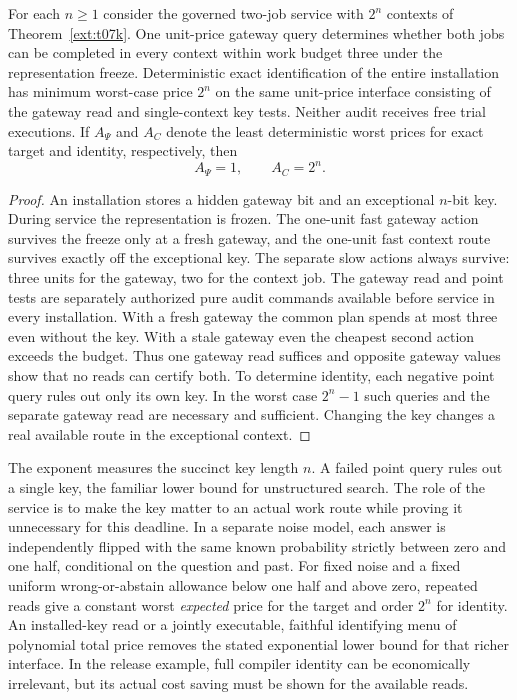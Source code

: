 \begin{theorem}\label{body:key}
For each \(n\ge1\) consider the governed two-job service with \(2^n\) contexts of Theorem~\ref{ext:t07k}. One unit-price gateway query determines whether both jobs can be completed in every context within work budget three under the representation freeze. Deterministic exact identification of the entire installation has minimum worst-case price \(2^n\) on the same unit-price interface consisting of the gateway read and single-context key tests. Neither audit receives free trial executions. If \(A_\Psi\) and \(A_C\) denote the least deterministic worst prices for exact target and identity, respectively, then
\[
 A_\Psi=1,\qquad A_C=2^n .
\]
\end{theorem}
\begin{proof}
An installation stores a hidden gateway bit and an exceptional \(n\)-bit key. During service the representation is frozen. The one-unit fast gateway action survives the freeze only at a fresh gateway, and the one-unit fast context route survives exactly off the exceptional key. The separate slow actions always survive: three units for the gateway, two for the context job. The gateway read and point tests are separately authorized pure audit commands available before service in every installation. With a fresh gateway the common plan spends at most three even without the key. With a stale gateway even the cheapest second action exceeds the budget. Thus one gateway read suffices and opposite gateway values show that no reads can certify both. To determine identity, each negative point query rules out only its own key. In the worst case \(2^n-1\) such queries and the separate gateway read are necessary and sufficient. Changing the key changes a real available route in the exceptional context.
\end{proof}
The exponent measures the succinct key length \(n\). A failed point query rules out a single key, the familiar lower bound for unstructured search. The role of the service is to make the key matter to an actual work route while proving it unnecessary for this deadline. In a separate noise model, each answer is independently flipped with the same known probability strictly between zero and one half, conditional on the question and past. For fixed noise and a fixed uniform wrong-or-abstain allowance below one half and above zero, repeated reads give a constant worst \emph{expected} price for the target and order \(2^n\) for identity. An installed-key read or a jointly executable, faithful identifying menu of polynomial total price removes the stated exponential lower bound for that richer interface. In the release example, full compiler identity can be economically irrelevant, but its actual cost saving must be shown for the available reads.

